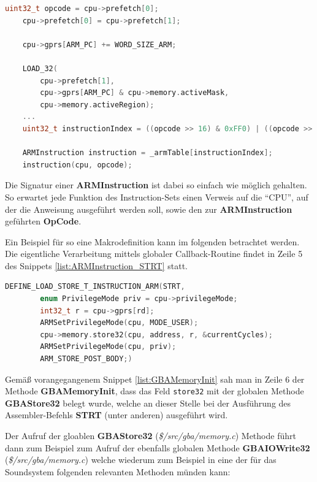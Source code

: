 \documentclass[11pt,a4paper]{scrartcl}
\begin{document}
\vspace{5mm}
\begin{lstlisting}[language=C++, caption={Ausschnitt aus der \textbf{ARMStep}-Methode}, label={list:ARMStep}]
    uint32_t opcode = cpu->prefetch[0];
	cpu->prefetch[0] = cpu->prefetch[1];

	cpu->gprs[ARM_PC] += WORD_SIZE_ARM;
	
	LOAD_32(
	    cpu->prefetch[1],
	    cpu->gprs[ARM_PC] & cpu->memory.activeMask,
	    cpu->memory.activeRegion);
    ...
	uint32_t instructionIndex = ((opcode >> 16) & 0xFF0) | ((opcode >> 4) & 0x00F);
	
	ARMInstruction instruction = _armTable[instructionIndex];
	instruction(cpu, opcode);
\end{lstlisting}

Die Signatur einer \textbf{ARMInstruction} ist dabei so einfach wie m\"oglich gehalten. So erwartet jede Funktion des Instruction-Sets einen Verweis auf die \enquote{CPU}, auf der die Anweisung ausgef\"uhrt werden soll, sowie den zur \textbf{ARMInstruction} gef\"uhrten \textbf{OpCode}.

Ein Beispiel f\"ur so eine Makrodefinition kann im folgenden betrachtet werden. Die eigentliche Verarbeitung mittels globaler Callback-Routine findet in Zeile 5 des Snippets \ref{list:ARMInstruction_STRT} statt.

\vspace{5mm}
\begin{lstlisting}[language=C++, caption={ARM Instruction Makro f\"ur \textbf{STRT}}, label={list:ARMInstruction_STRT}]
    DEFINE_LOAD_STORE_T_INSTRUCTION_ARM(STRT,
	    enum PrivilegeMode priv = cpu->privilegeMode;
	    int32_t r = cpu->gprs[rd];
	    ARMSetPrivilegeMode(cpu, MODE_USER);
	    cpu->memory.store32(cpu, address, r, &currentCycles);
	    ARMSetPrivilegeMode(cpu, priv);
	    ARM_STORE_POST_BODY;)
\end{lstlisting}

Gem\"a{\ss} vorangegangenem Snippet \ref{list:GBAMemoryInit} sah man in Zeile 6 der Methode \textbf{GBAMemoryInit}, dass das Feld \verb|store32| mit der globalen Methode \textbf{GBAStore32} belegt wurde, welche an dieser Stelle bei der Ausf\"uhrung des Assembler-Befehls \textbf{STRT} (unter anderen) ausgef\"uhrt wird.

Der Aufruf der gloablen \textbf{GBAStore32} (\textit{\$/src/gba/memory.c}) Methode f\"uhrt dann zum Beispiel zum Aufruf der ebenfalls globalen Methode \textbf{GBAIOWrite32} (\textit{\$/src/gba/memory.c}) welche wiederum zum Beispiel in eine der f\"ur das Soundsystem folgenden relevanten Methoden m\"unden kann:
\end{document}
